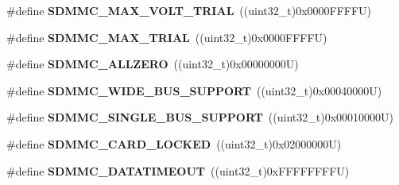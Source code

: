 \begin{DoxyCompactItemize}
\mbox{\label{group___s_d_m_m_c___l_l___exported___constants_ga9d9a505bffcb0e40bf694ae7dc6deb0d}} 
\#define {\bfseries S\+D\+M\+M\+C\+\_\+\+M\+A\+X\+\_\+\+V\+O\+L\+T\+\_\+\+T\+R\+I\+AL}~((uint32\+\_\+t)0x0000\+F\+F\+F\+F\+U)
\item 
\mbox{\label{group___s_d_m_m_c___l_l___exported___constants_ga5c9524b8fa92854de3783ca3104ef14e}} 
\#define {\bfseries S\+D\+M\+M\+C\+\_\+\+M\+A\+X\+\_\+\+T\+R\+I\+AL}~((uint32\+\_\+t)0x0000\+F\+F\+F\+F\+U)
\item 
\mbox{\label{group___s_d_m_m_c___l_l___exported___constants_gaa8e9aa9a27b737a294184cd99b83f969}} 
\#define {\bfseries S\+D\+M\+M\+C\+\_\+\+A\+L\+L\+Z\+E\+RO}~((uint32\+\_\+t)0x00000000\+U)
\item 
\mbox{\label{group___s_d_m_m_c___l_l___exported___constants_gaf3713a91167932d72c7487d82bb1425c}} 
\#define {\bfseries S\+D\+M\+M\+C\+\_\+\+W\+I\+D\+E\+\_\+\+B\+U\+S\+\_\+\+S\+U\+P\+P\+O\+RT}~((uint32\+\_\+t)0x00040000\+U)
\item 
\mbox{\label{group___s_d_m_m_c___l_l___exported___constants_gaa7726d37ad7affd0b51ab5a1d668c953}} 
\#define {\bfseries S\+D\+M\+M\+C\+\_\+\+S\+I\+N\+G\+L\+E\+\_\+\+B\+U\+S\+\_\+\+S\+U\+P\+P\+O\+RT}~((uint32\+\_\+t)0x00010000\+U)
\item 
\mbox{\label{group___s_d_m_m_c___l_l___exported___constants_gaa3bd4adeb590eae5306a5911529f3892}} 
\#define {\bfseries S\+D\+M\+M\+C\+\_\+\+C\+A\+R\+D\+\_\+\+L\+O\+C\+K\+ED}~((uint32\+\_\+t)0x02000000\+U)
\item 
\mbox{\label{group___s_d_m_m_c___l_l___exported___constants_ga0958cdf51becb2e74460c0ca8795468f}} 
\#define {\bfseries S\+D\+M\+M\+C\+\_\+\+D\+A\+T\+A\+T\+I\+M\+E\+O\+UT}~((uint32\+\_\+t)0x\+F\+F\+F\+F\+F\+F\+F\+F\+U)
\item 
\mbox{\label{group___s_d_m_m_c___l_l___exported___constants_ga8787e233b34487397473e83a0d3b91e6}} 

\end{DoxyCompactItemize}
